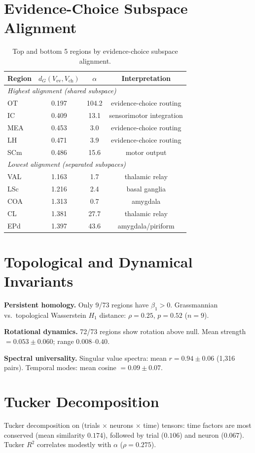 \documentclass{article}
\begin{document}
\section{Evidence-Choice Subspace Alignment}
\label{app:alignment}

\begin{table}[h]
\centering
\small
\caption{Top and bottom 5 regions by evidence-choice subspace alignment.}
\label{tab:routing}
\begin{tabular}{@{}lccc@{}}
\toprule
\textbf{Region} & \textbf{$d_G(V_{\text{ev}}, V_{\text{ch}})$} & \textbf{$\alpha$} & \textbf{Interpretation} \\
\midrule
\multicolumn{4}{l}{\emph{Highest alignment (shared subspace)}} \\
OT & 0.197 & 104.2 & evidence-choice routing \\
IC & 0.409 & 13.1 & sensorimotor integration \\
MEA & 0.453 & 3.0 & evidence-choice routing \\
LH & 0.471 & 3.9 & evidence-choice routing \\
SCm & 0.486 & 15.6 & motor output \\
\midrule
\multicolumn{4}{l}{\emph{Lowest alignment (separated subspaces)}} \\
VAL & 1.163 & 1.7 & thalamic relay \\
LSc & 1.216 & 2.4 & basal ganglia \\
COA & 1.313 & 0.7 & amygdala \\
CL & 1.381 & 27.7 & thalamic relay \\
EPd & 1.397 & 43.6 & amygdala/piriform \\
\bottomrule
\end{tabular}
\end{table}

\section{Topological and Dynamical Invariants}
\label{app:topo_dyn}

\textbf{Persistent homology.} Only 9/73 regions have $\beta_1 > 0$. Grassmannian vs.\ topological Wasserstein $H_1$ distance: $\rho = 0.25$, $p = 0.52$ ($n = 9$).

\textbf{Rotational dynamics.} 72/73 regions show rotation above null. Mean strength $= 0.053 \pm 0.060$; range $0.008$--$0.40$.

\textbf{Spectral universality.} Singular value spectra: mean $r = 0.94 \pm 0.06$ (1,316 pairs). Temporal modes: mean cosine $= 0.09 \pm 0.07$.

\section{Tucker Decomposition}
\label{app:tucker}

Tucker decomposition on (trials $\times$ neurons $\times$ time) tensors: time factors are most conserved (mean similarity $0.174$), followed by trial ($0.106$) and neuron ($0.067$). Tucker $R^2$ correlates modestly with $\alpha$ ($\rho = 0.275$).
\end{document}
